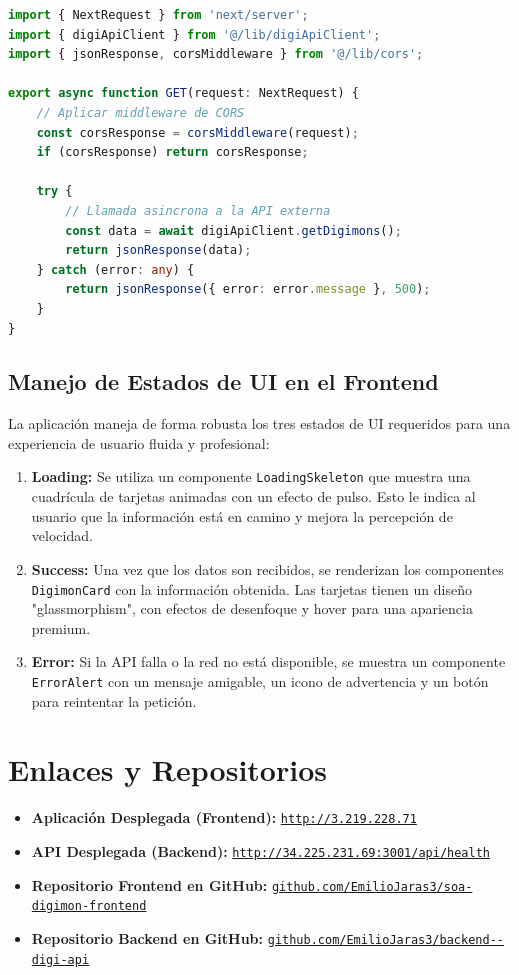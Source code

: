 \documentclass[11pt,a4paper]{article}
\begin{document}
\begin{lstlisting}[language=TypeScript, caption=Endpoint para obtener todos los Digimons (`/api/digimons/route.ts`)]
import { NextRequest } from 'next/server';
import { digiApiClient } from '@/lib/digiApiClient';
import { jsonResponse, corsMiddleware } from '@/lib/cors';

export async function GET(request: NextRequest) {
    // Aplicar middleware de CORS
    const corsResponse = corsMiddleware(request);
    if (corsResponse) return corsResponse;

    try {
        // Llamada asincrona a la API externa
        const data = await digiApiClient.getDigimons();
        return jsonResponse(data);
    } catch (error: any) {
        return jsonResponse({ error: error.message }, 500);
    }
}
\end{lstlisting}

\subsection{Manejo de Estados de UI en el Frontend}
La aplicación maneja de forma robusta los tres estados de UI requeridos para una experiencia de usuario fluida y profesional:
\begin{enumerate}
    \item \textbf{Loading:} Se utiliza un componente \texttt{LoadingSkeleton} que muestra una cuadrícula de tarjetas animadas con un efecto de pulso. Esto le indica al usuario que la información está en camino y mejora la percepción de velocidad.
    \item \textbf{Success:} Una vez que los datos son recibidos, se renderizan los componentes \texttt{DigimonCard} con la información obtenida. Las tarjetas tienen un diseño "glassmorphism", con efectos de desenfoque y hover para una apariencia premium.
    \item \textbf{Error:} Si la API falla o la red no está disponible, se muestra un componente \texttt{ErrorAlert} con un mensaje amigable, un icono de advertencia y un botón para reintentar la petición.
\end{enumerate}

\section{Enlaces y Repositorios}
\begin{itemize}
    \item \textbf{Aplicación Desplegada (Frontend):} \href{http://3.219.228.71}{\nolinkurl{http://3.219.228.71}}
    \item \textbf{API Desplegada (Backend):} \href{http://34.225.231.69:3001/api/health}{\nolinkurl{http://34.225.231.69:3001/api/health}}
    \item \textbf{Repositorio Frontend en GitHub:} \href{https://github.com/EmilioJaras3/soa-digimon-frontend}{\nolinkurl{github.com/EmilioJaras3/soa-digimon-frontend}}
    \item \textbf{Repositorio Backend en GitHub:} \href{https://github.com/EmilioJaras3/backend--digi-api}{\nolinkurl{github.com/EmilioJaras3/backend--digi-api}}
\end{itemize}
\end{document}
